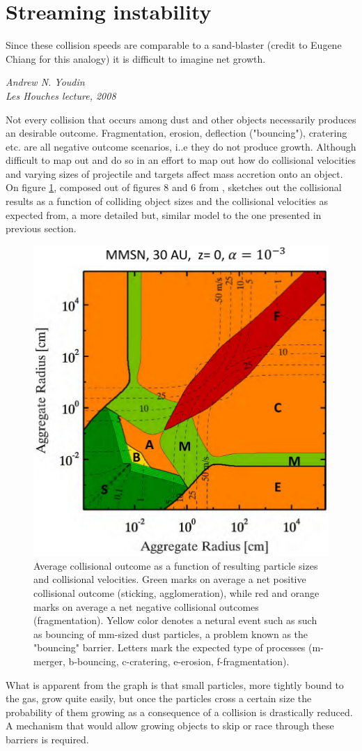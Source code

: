 \documentclass[12pt]{article}
\begin{document}
\newpage
\section{Streaming instability}
\label{sec:streaminginstability}

\epigraph{\centering Since these collision speeds are comparable to a sand-blaster (credit to Eugene Chiang for this analogy) it is difficult to imagine net growth.}{\textit{Andrew N. Youdin \\ Les Houches lecture, 2008}}

Not every collision that occurs among dust and other objects necessarily produces an desirable outcome. Fragmentation, erosion, deflection ("bouncing"), cratering etc. are all negative outcome scenarios, i..e they do not produce growth. Although difficult to map out \cite{Windmark12} and \cite{Birnstiel2016} do so in an effort to map out how do collisional velocities and varying sizes of projectile and targets affect mass accretion onto an object. On figure \ref{fig:coloutcomes}, composed out of figures 8 and 6 from \citet{Windmark12}, \cite{Fulle} sketches out the collisional results as a function of colliding object sizes and the collisional velocities as expected from, a more detailed but, similar model to the one presented in previous section. 
\begin{figure}[htbp]
    \label{fig:coloutcomes}
    \centering
    \includegraphics[width=0.5\linewidth]{FulleGraph.png}
    \caption{Average collisional outcome as a function of resulting particle sizes and collisional velocities. Green marks on average a net positive collisional outcome (sticking, agglomeration), while red and orange marks on average a net negative collisional outcomes (fragmentation). Yellow color denotes a netural event such as such as bouncing of mm-sized dust particles, a problem known as the "bouncing" barrier. Letters mark the expected type of processes (m-merger, b-bouncing, c-cratering, e-erosion, f-fragmentation). }
\end{figure}
What is apparent from the graph is that small particles, more tightly bound to the gas, grow quite easily, but once the particles cross a certain size the probability of them growing as a consequence of a collision is drastically reduced. A mechanism that would allow growing objects to skip or race through these barriers is required. 
\end{document}
